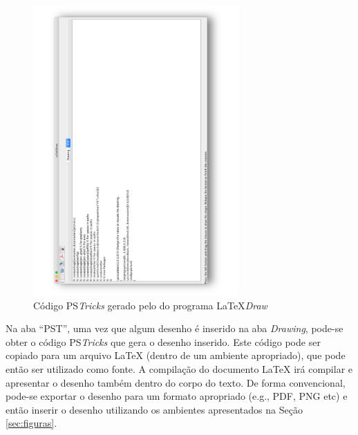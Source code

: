 \begin{figure}[H]
\caption{Código PS\textit{Tricks} gerado pelo do programa \LaTeX\textit{Draw}}
\vspace{6mm}
    \begin{center}
        \includegraphics[width=0.7\textwidth,angle=-90]{./docs/figs/ldraw2.pdf}
    \end{center}
\vspace{4mm}
\label{fig:interld}
\end{figure}

Na aba ``PST'', uma vez que algum desenho é inserido na aba \textit{Drawing}, pode-se obter o código PS\textit{Tricks} que gera o desenho inserido. Este código pode ser copiado para um arquivo \LaTeX{} (dentro de um ambiente apropriado), que pode então ser utilizado como fonte. A compilação do documento \LaTeX{} irá compilar e apresentar o desenho também dentro do corpo do texto. De forma convencional, pode-se exportar o desenho para um formato apropriado (e.g., PDF, PNG etc) e então inserir o desenho utilizando os ambientes apresentados na Seção \ref{sec:figuras}.

